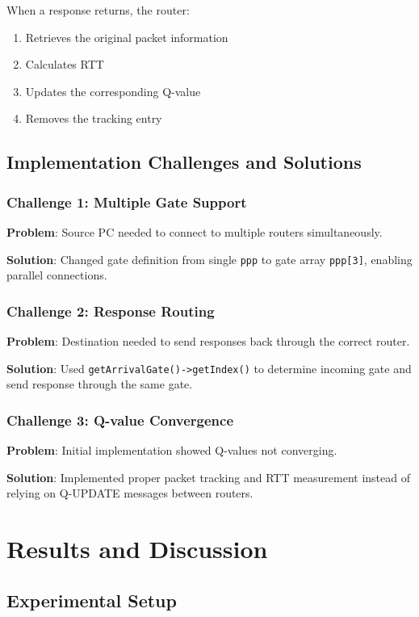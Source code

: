 \documentclass[12pt,a4paper]{article}
\begin{document}
When a response returns, the router:
\begin{enumerate}
    \item Retrieves the original packet information
    \item Calculates RTT
    \item Updates the corresponding Q-value
    \item Removes the tracking entry
\end{enumerate}

\subsection{Implementation Challenges and Solutions}

\subsubsection{Challenge 1: Multiple Gate Support}
\textbf{Problem}: Source PC needed to connect to multiple routers simultaneously.

\textbf{Solution}: Changed gate definition from single \texttt{ppp} to gate array \texttt{ppp[3]}, enabling parallel connections.

\subsubsection{Challenge 2: Response Routing}
\textbf{Problem}: Destination needed to send responses back through the correct router.

\textbf{Solution}: Used \texttt{getArrivalGate()->getIndex()} to determine incoming gate and send response through the same gate.

\subsubsection{Challenge 3: Q-value Convergence}
\textbf{Problem}: Initial implementation showed Q-values not converging.

\textbf{Solution}: Implemented proper packet tracking and RTT measurement instead of relying on Q-UPDATE messages between routers.

\section{Results and Discussion}

\subsection{Experimental Setup}
\end{document}
